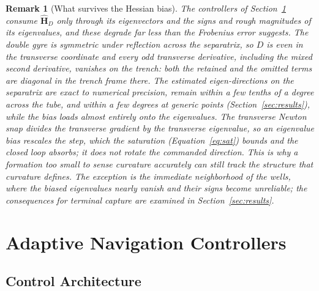 \documentclass[12pt, letterpaper, oneside]{report}
\newtheorem{remark}[theorem]{Remark}
\begin{document}
\begin{remark}[What survives the Hessian bias]
\label{rem:eigvec}
The controllers of Section~\ref{sec:controllers} consume
$\hat{\mathbf{H}}_D$ only through its eigenvectors and the signs and rough
magnitudes of its eigenvalues, and these degrade far less than the
Frobenius error suggests. The double gyre is symmetric under reflection
across the separatrix, so $D$ is even in the transverse coordinate and
every odd transverse derivative, including the mixed second derivative,
vanishes on the trench: both the retained and the omitted terms are
diagonal in the trench frame there. The estimated eigen-directions on the
separatrix are exact to numerical precision, remain within a few tenths of
a degree across the tube, and within a few degrees at generic points
(Section~\ref{sec:results}), while the bias loads almost entirely onto the
eigenvalues. The transverse Newton snap divides the transverse gradient by
the transverse eigenvalue, so an eigenvalue bias rescales the step, which
the saturation (Equation~\eqref{eq:sat}) bounds and the closed loop
absorbs; it does not rotate the commanded direction. This is why a
formation too small to sense curvature accurately can still track the
structure that curvature defines. The exception is the immediate
neighborhood of the wells, where the biased eigenvalues nearly vanish and
their signs become unreliable; the consequences for terminal capture are
examined in Section~\ref{sec:results}.
\end{remark}

\section{Adaptive Navigation Controllers}
\label{sec:controllers}

\subsection{Control Architecture}
\label{sec:arch}
\end{document}
